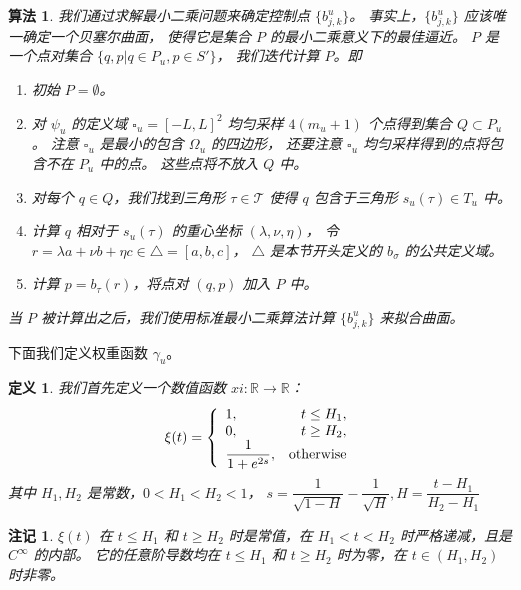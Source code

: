 \documentclass{ctexart}
\newtheorem{Def}{定义}
\newtheorem{Rmk}{注记}
\newtheorem{Algo}{算法}
\begin{document}
		\begin{Algo}
			我们通过求解最小二乘问题来确定控制点 $\{b_{j,k}^u\}$。
			事实上，$\{b_{j,k}^u\}$ 应该唯一确定一个贝塞尔曲面，
			使得它是集合 $P$ 的最小二乘意义下的最佳逼近。
			$P$ 是一个点对集合 $\{q,p|q\in P_u,p\in S'\}$，
			我们迭代计算 $P$。即
			
			\begin{enumerate}
				\item 初始 $P=\emptyset$。
				\item
					对 $\psi_u$ 的定义域 $\square_u = [-L,L]^2$ 均匀采样 $4(m_u+1)$ 个点得到集合 $Q\subset P_u$。
					注意 $\square_u$ 是最小的包含 $\Omega_u$ 的四边形，
					还要注意 $\square_u$ 均匀采样得到的点将包含不在 $P_u$ 中的点。
					这些点将不放入 $Q$ 中。
				\item
					对每个 $q\in Q$，我们找到三角形 $\tau \in \mathcal{T}$ 使得
					$q$ 包含于三角形 $s_u(\tau)\in T_u$ 中。
				\item
					计算 $q$ 相对于 $s_u(\tau)$ 的重心坐标 $(\lambda,\nu,\eta)$，
					令 $r=\lambda a+\nu b+\eta c\in \triangle=[a,b,c]$，
					$\triangle$ 是本节开头定义的 $b_{\sigma}$ 的公共定义域。
				\item
					计算 $p=b_{\tau}(r)$，将点对 $(q,p)$ 加入 $P$ 中。
			\end{enumerate}
	
			当 $P$ 被计算出之后，我们使用标准最小二乘算法计算 $\{b_{j,k}^u\}$ 来拟合曲面。	
		\end{Algo}
		
		下面我们定义权重函数 $\gamma_u$。
		\begin{Def}
			我们首先定义一个数值函数 $xi:\mathbb{R}\rightarrow \mathbb{R}$：
			\begin{equation}
				\xi(t)=
				\begin{aligned}
					\left\{
						\begin{array}{lr}
							1, & t\leq H_1, \\
							0, & t\geq H_2, \\
							\dfrac 1{1+e^{2s}}, & \rm{otherwise}\\
						\end{array}
					\right.
				\end{aligned}
			\end{equation}
			其中 $H_1,H_2$ 是常数，$0<H_1<H_2<1$，
			$s = \dfrac{1}{\sqrt{1-H}} - \dfrac{1}{\sqrt H},H = \dfrac{t-H_1}{H_2-H_1}$
		\end{Def}
		\begin{Rmk}
			$\xi(t)$ 在 $t\leq H_1$ 和 $t\geq H_2$ 时是常值，在 $H_1<t<H_2$ 时严格递减，且是 $C^{\infty}$ 的内部。
			它的任意阶导数均在 $t\leq H_1$ 和 $t\geq H_2$ 时为零，在 $t\in (H_1,H_2)$ 时非零。
		\end{Rmk}
		
\end{document}
